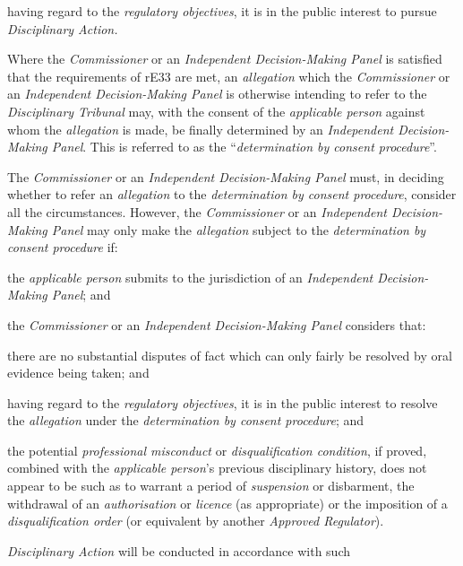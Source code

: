 \item having regard to the \emph{regulatory objectives}, it is in the
public interest to pursue \emph{Disciplinary Action.}\ln
{}\par
Where the \emph{Commissioner }or an \emph{Independent Decision-Making
Panel }is satisfied that the requirements of rE33 are met,
an \emph{allegation} which the \emph{Commissioner }or
an \emph{Independent Decision-Making Panel }is otherwise intending to
refer to the \emph{Disciplinary Tribunal} may, with the consent of
the \emph{applicable person} against whom the \emph{allegation} is made,
be finally determined by an \emph{Independent Decision-Making Panel}.
This is referred to as the ``\emph{determination by consent
procedure}''.\\
\par
The \emph{Commissioner }or an \emph{Independent Decision-Making
Panel }must, in deciding whether to refer an \emph{allegation} to
the \emph{determination by consent procedure}, consider all the
circumstances. However, the \emph{Commissioner }or an \emph{Independent
Decision-Making Panel }may only make the \emph{allegation} subject to
the \emph{determination by consent procedure }if:\\\nl \item the \emph{applicable person} submits to the jurisdiction of
an \emph{Independent Decision-Making Panel}; and\item the \emph{Commissioner }or an \emph{Independent Decision-Making
Panel }considers that:\\
\al \item there are no substantial disputes of fact which can only fairly be
resolved by oral evidence being taken; and\item having regard to the \emph{regulatory objectives}, it is in the
public interest to resolve the \emph{allegation} under
the \emph{determination by consent procedure}; and\item the potential\emph{ professional
misconduct} or \emph{disqualification condition}, if proved, combined
with the \emph{applicable person}'s previous disciplinary history, does
not appear to be such as to warrant a period of \emph{suspension} or
disbarment, the withdrawal of
an \emph{authorisation} or \emph{licence} (as appropriate) or the
imposition of a \emph{disqualification order} (or equivalent by
another \emph{Approved Regulator}).\la\ln
{}\par
\emph{Disciplinary Action} will be conducted in accordance with such
